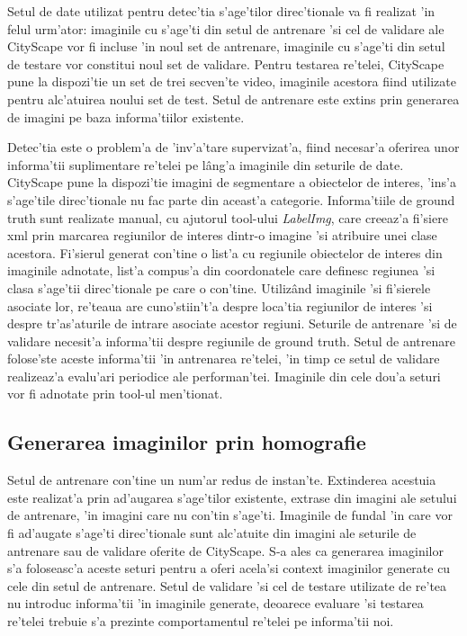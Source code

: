 \documentclass[12pt,a4paper,twoside]{report}
\begin{document}
Setul de date utilizat pentru detec'tia s'age'tilor direc'tionale va fi realizat 'in felul urm'ator: imaginile  cu s'age'ti din setul de antrenare 'si cel de validare ale CityScape vor fi incluse 'in noul set de antrenare, imaginile  cu s'age'ti din setul de testare vor constitui noul set de validare. Pentru testarea re'telei, CityScape pune la dispozi'tie un set de trei secven'te video, imaginile acestora fiind utilizate pentru alc'atuirea noului set de test. Setul de antrenare este extins prin generarea de imagini pe baza informa'tiilor existente. 

Detec'tia este o problem'a de 'inv'a'tare supervizat'a, fiind necesar'a oferirea unor informa'tii suplimentare re'telei pe l\^ang'a imaginile din seturile de date. CityScape pune la dispozi'tie imagini de segmentare a obiectelor de interes, 'ins'a s'age'tile direc'tionale nu fac parte din aceast'a categorie. Informa'tiile de ground truth sunt realizate manual, cu ajutorul tool-ului \textit{LabelImg}, care creeaz'a fi'siere xml prin marcarea regiunilor de interes dintr-o imagine 'si atribuire unei clase acestora. Fi'sierul generat con'tine o list'a cu regiunile obiectelor de interes din imaginile adnotate, list'a compus'a din coordonatele care definesc regiunea 'si clasa s'age'tii direc'tionale pe care o con'tine. Utiliz\^and imaginile 'si fi'sierele asociate lor, re'teaua are cuno'stiin't'a despre loca'tia regiunilor de interes 'si despre tr'as'aturile de intrare asociate acestor regiuni. Seturile de antrenare 'si de validare necesit'a informa'tii despre regiunile de ground truth. Setul de antrenare folose'ste aceste informa'tii 'in antrenarea re'telei, 'in timp ce setul de validare realizeaz'a evalu'ari periodice ale performan'tei. Imaginile din cele dou'a seturi vor fi adnotate prin tool-ul men'tionat. 

\subsection{Generarea imaginilor prin homografie}
Setul de antrenare con'tine un num'ar redus de instan'te. Extinderea acestuia este realizat'a prin ad'augarea s'age'tilor existente, extrase din imagini ale setului de antrenare, 'in imagini care nu con'tin s'age'ti. Imaginile de fundal 'in care vor fi ad'augate s'age'ti direc'tionale sunt alc'atuite din imagini ale seturile de antrenare sau de validare oferite de CityScape. S-a ales ca generarea imaginilor s'a foloseasc'a aceste seturi pentru a oferi acela'si context imaginilor generate cu cele din setul de antrenare. Setul de validare 'si cel de testare utilizate de re'tea nu introduc informa'tii 'in imaginile generate, deoarece evaluare 'si testarea re'telei trebuie s'a prezinte comportamentul re'telei pe informa'tii noi.
\end{document}
